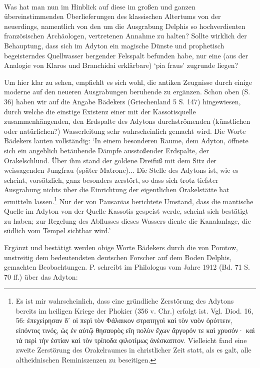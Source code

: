 \documentclass[a4paper, 11pt, oneside]{article}
\begin{document}
\paragraph{}
Was hat man nun im Hinblick auf diese im großen und ganzen übereinstimmenden Überlieferungen des klassischen Altertums von der neuerdings, namentlich von den um die Ausgrabung Delphis so hochverdienten französischen Archäologen, vertretenen Annahme zu halten? Sollte wirklich der Behauptung, dass sich im Adyton ein magische Dünste und prophetisch begeisterndes Quellwasser bergender Felsspalt befunden habe, nur eine (aus der Analogie von Klaros und Branchidai erklärbare) `pia fraus' zugrunde liegen?

Um hier klar zu sehen, empfiehlt es sich wohl, die antiken Zeugnisse durch einige moderne auf den neueren Ausgrabungen beruhende zu ergänzen. Schon oben (S. 36) haben wir auf die Angabe Bädekers (Griechenland 5 S. 147) hingewiesen, durch welche die einstige Existenz einer mit der Kassotisquelle zusammenhängenden, den Erdspalte des Adytons durchströmenden (künstlichen oder natürlichen?) Wasserleitung sehr wahrscheinlich gemacht wird. Die Worte Bädekers lauten vollständig: `In einem besonderen Raume, dem Adyton, öffnete sich ein angeblich betäubende Dämpfe ausstoßender Erdspalte, der Orakelschlund. Über ihm stand der goldene Dreifuß mit dem Sitz der weissagenden Jungfrau (später Matrone)... Die Stelle des Adytons ist, wie es scheint, vorsätzlich, ganz besonders zerstört, so dass sich trotz tiefster Ausgrabung nichts über die Einrichtung der eigentlichen Orakelstätte hat ermitteln lassen.\footnote{Es ist mir wahrscheinlich, dass eine gründliche Zerstörung des Adytons bereits im heiligen Kriege der Phokier (356 v. Chr.) erfolgt ist. Vgl. Diod. 16, 56: ἐπεχείρησαν δ᾽ οἱ περὶ τὸν Φάλαικον στρατηγοὶ καὶ τὸν ναὸν ὀρύττειν, εἰπόντος τινός, ὡς ἐν αὐτῷ θησαυρὸς εἴη πολὺν ἔχων ἄργυρόν τε καὶ χρυσόν· καὶ τὰ περὶ τὴν ἑστίαν καὶ τὸν τρίποδα φιλοτίμως ἀνέσκαπτον. Vielleicht fand eine zweite Zerstörung des Orakelraumes in christlicher Zeit statt, als es galt, alle altheidnischen Reminiszenzen zu beseitigen.} Nur der von Pausanias berichtete Umstand, dass die mantische Quelle im Adyton von der Quelle Kassotis gespeist werde, scheint sich bestätigt zu haben; zur Regelung des Abflusses dieses Wassers diente die Kanalanlage, die südlich vom Tempel sichtbar wird.'

Ergänzt und bestätigt werden obige Worte Bädekers durch die von Pomtow, unstreitig dem bedeutendsten deutschen Forscher auf dem Boden Delphis, gemachten Beobachtungen. P. schreibt im Philologus vom Jahre 1912 (Bd. 71 S. 70 ff.) über das Adyton:
\end{document}

